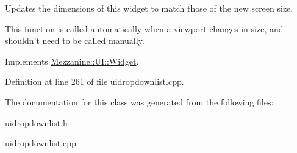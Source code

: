 Updates the dimensions of this widget to match those of the new screen size. 

This function is called automatically when a viewport changes in size, and shouldn't need to be called manually. 

Implements \hyperlink{classMezzanine_1_1UI_1_1Widget_af23f919f2912ac10230953a848c9889c}{Mezzanine::UI::Widget}.



Definition at line 261 of file uidropdownlist.cpp.



The documentation for this class was generated from the following files:\begin{DoxyCompactItemize}
\item 
uidropdownlist.h\item 
uidropdownlist.cpp\end{DoxyCompactItemize}
